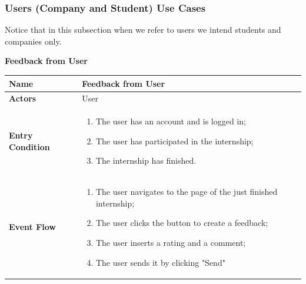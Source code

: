     \subsubsection{Users (Company and Student) Use Cases}
    Notice that in this subsection when we refer to users we intend students and companies only.
        \begin{enumerate}[label=\textbf{[US\arabic*]}, left = 0pt, align = left, resume]
            \item \textbf{Feedback from User}
            
            \begin{longtable}{|l|p{11cm}|}  
                \hline
                \textbf{Name} & 
                    \textbf{Feedback from User} \\
                \hline
                
                \textbf{Actors} & 
                    User\\
                \hline
                
                \textbf{Entry Condition} & 
                    \begin{enumerate}[label=\textbullet, itemsep=0em]
                        \item The user has an account and is logged in;
                        \item The user has participated in the internship;
                        \item The internship has finished.
                    \end{enumerate} \\
                \hline
                
                \textbf{Event Flow} &
                    \begin{enumerate}[label=\arabic*., itemsep=0.2em]
                        \item The user navigates to the page of the just finished internship;
                        \item The user clicks the button to create a feedback;
                        \item The user inserts a rating and a comment;
                        \item The user sends it by clicking "Send" 
                    \end{enumerate} \\
                \hline
                

\end{longtable}
\end{enumerate}
